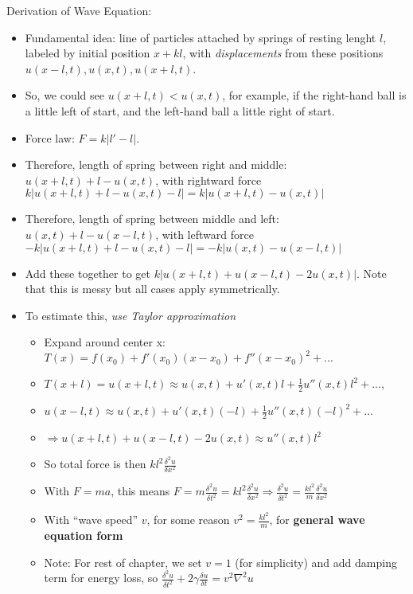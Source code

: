 \documentclass[11pt, oneside]{article}   	%
\begin{document}
Derivation of Wave Equation:
\begin{itemize}
\item Fundamental idea: line of particles attached by springs of resting lenght $l$, labeled by initial position $x+kl$, with \emph{displacements} from these positions $u(x-l,t), u(x,t), u(x+l,t)$.  
\item So, we could see $u(x+l, t) < u(x, t)$, for example, if the right-hand ball is a little left of start, and the left-hand ball a little right of start.
\item Force law: $F = k | l' - l |$.
\item Therefore, length of spring between right and middle: $u(x+l, t) + l - u(x,t)$, with rightward force $k | u(x+l, t) + l - u(x,t) - l | = k|u(x+l, t) - u(x,t)|$
\item Therefore, length of spring between middle and left: $u(x, t) + l - u(x-l,t)$, with leftward force $-k | u(x+l, t) + l - u(x,t) - l | = -k|u(x, t) - u(x-l, t)|$
\item Add these together to get $k |u(x+l, t) + u(x-l, t) - 2u(x,t)|$.  Note that this is messy but all cases apply symmetrically.
\item To estimate this, \emph{use Taylor approximation}
\begin{itemize}
\item Expand around center x: $T(x) = f(x_0) + f'(x_0)(x-x_0) + f''(x-x_0)^2 + ...$
\item $T(x+l) = u(x+l, t) \approx u(x,t) + u'(x,t)l + \frac{1}{2}u''(x,t)l^2 + ...$,
\item $u(x-l, t) \approx u(x,t) + u'(x,t)(-l) + \frac{1}{2}u''(x,t)(-l)^2 + ...$
\item $\Rightarrow u(x+l, t) + u(x-l, t)  - 2u(x,t) \approx u''(x,t)l^2$
\item So total force is then $kl^2\frac{\delta^2u}{\delta x^2}$
\item With $F=ma$, this means $F=m\frac{\delta^2u}{\delta t^2} = kl^2\frac{\delta^2u}{\delta x^2} \Rightarrow \frac{\delta^2u}{\delta t^2} = \frac{kl^2}{m}\frac{\delta^2u}{\delta x^2} $
\item With ``wave speed'' $v$, for some reason $v^2 = \frac{kl^2}{m}$, for \textbf{general wave equation form}  
\item Note: For rest of chapter, we set $v=1$ (for simplicity) and add damping term for energy loss, so $ \frac{\delta^2u}{\delta t^2} + 2\gamma \frac{\delta u}{\delta t}= v^2 \nabla^2u$
\end{itemize}


\end{itemize}
\end{document}
